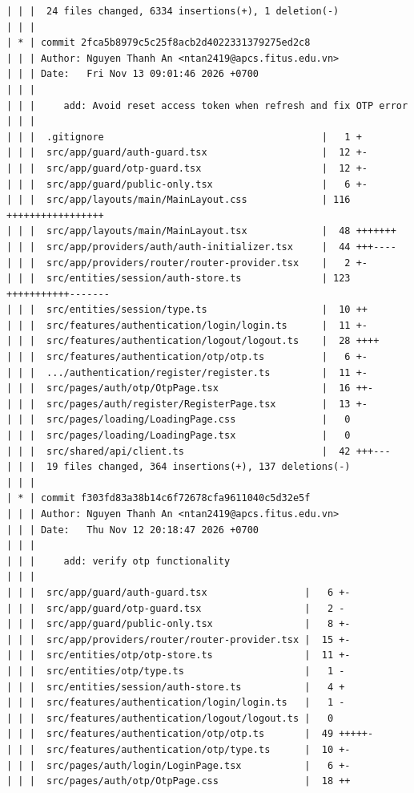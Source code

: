 \documentclass[12pt]{article}
\begin{document}
\begin{lstlisting}[numbers=none,breaklines=true]
| | |  24 files changed, 6334 insertions(+), 1 deletion(-)
| | |
| * | commit 2fca5b8979c5c25f8acb2d4022331379275ed2c8
| | | Author: Nguyen Thanh An <ntan2419@apcs.fitus.edu.vn>
| | | Date:   Fri Nov 13 09:01:46 2026 +0700
| | |
| | |     add: Avoid reset access token when refresh and fix OTP error
| | |
| | |  .gitignore                                      |   1 +
| | |  src/app/guard/auth-guard.tsx                    |  12 +-
| | |  src/app/guard/otp-guard.tsx                     |  12 +-
| | |  src/app/guard/public-only.tsx                   |   6 +-
| | |  src/app/layouts/main/MainLayout.css             | 116 +++++++++++++++++
| | |  src/app/layouts/main/MainLayout.tsx             |  48 +++++++
| | |  src/app/providers/auth/auth-initializer.tsx     |  44 +++----
| | |  src/app/providers/router/router-provider.tsx    |   2 +-
| | |  src/entities/session/auth-store.ts              | 123 +++++++++++-------
| | |  src/entities/session/type.ts                    |  10 ++
| | |  src/features/authentication/login/login.ts      |  11 +-
| | |  src/features/authentication/logout/logout.ts    |  28 ++++
| | |  src/features/authentication/otp/otp.ts          |   6 +-
| | |  .../authentication/register/register.ts         |  11 +-
| | |  src/pages/auth/otp/OtpPage.tsx                  |  16 ++-
| | |  src/pages/auth/register/RegisterPage.tsx        |  13 +-
| | |  src/pages/loading/LoadingPage.css               |   0
| | |  src/pages/loading/LoadingPage.tsx               |   0
| | |  src/shared/api/client.ts                        |  42 +++---
| | |  19 files changed, 364 insertions(+), 137 deletions(-)
| | |
| * | commit f303fd83a38b14c6f72678cfa9611040c5d32e5f
| | | Author: Nguyen Thanh An <ntan2419@apcs.fitus.edu.vn>
| | | Date:   Thu Nov 12 20:18:47 2026 +0700
| | |
| | |     add: verify otp functionality
| | |
| | |  src/app/guard/auth-guard.tsx                 |   6 +-
| | |  src/app/guard/otp-guard.tsx                  |   2 -
| | |  src/app/guard/public-only.tsx                |   8 +-
| | |  src/app/providers/router/router-provider.tsx |  15 +-
| | |  src/entities/otp/otp-store.ts                |  11 +-
| | |  src/entities/otp/type.ts                     |   1 -
| | |  src/entities/session/auth-store.ts           |   4 +
| | |  src/features/authentication/login/login.ts   |   1 -
| | |  src/features/authentication/logout/logout.ts |   0
| | |  src/features/authentication/otp/otp.ts       |  49 +++++-
| | |  src/features/authentication/otp/type.ts      |  10 +-
| | |  src/pages/auth/login/LoginPage.tsx           |   6 +-
| | |  src/pages/auth/otp/OtpPage.css               |  18 ++

\end{lstlisting}
\end{document}

